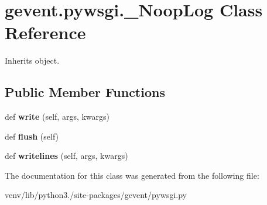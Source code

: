 \hypertarget{classgevent_1_1pywsgi_1_1___noop_log}{}\section{gevent.\+pywsgi.\+\_\+\+Noop\+Log Class Reference}
\label{classgevent_1_1pywsgi_1_1___noop_log}


Inherits object.

\subsection*{Public Member Functions}
\begin{DoxyCompactItemize}
\item 
\mbox{\label{classgevent_1_1pywsgi_1_1___noop_log_af96f3a4fd4e4303b0c4d44e9bf24e115}} 
def {\bfseries write} (self, args, kwargs)
\item 
\mbox{\label{classgevent_1_1pywsgi_1_1___noop_log_a1beffe4ea7a6c2c5accfa26770a42ab1}} 
def {\bfseries flush} (self)
\item 
\mbox{\label{classgevent_1_1pywsgi_1_1___noop_log_ac0f793a22c0b10337487e85980dc0207}} 
def {\bfseries writelines} (self, args, kwargs)
\end{DoxyCompactItemize}


The documentation for this class was generated from the following file\+:\begin{DoxyCompactItemize}
\item 
venv/lib/python3./site-\/packages/gevent/pywsgi.\+py\end{DoxyCompactItemize}
